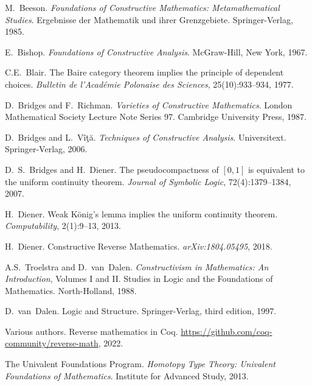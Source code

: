 \documentclass[11pt]{article}
\theoremstyle{plain}
\theoremstyle{definition}
\begin{document}

\begin{thebibliography}{99}

M.~Beeson.
\newblock \emph{Foundations of Constructive Mathematics: Metamathematical Studies}.
\newblock Ergebnisse der Mathematik und ihrer Grenzgebiete. Springer-Verlag, 1985.

E.~Bishop.
\newblock \emph{Foundations of Constructive Analysis}.
\newblock McGraw-Hill, New York, 1967.

C.E.~Blair.
\newblock The {B}aire category theorem implies the principle of dependent choices.
\newblock \emph{Bulletin de l'Acad\'{e}mie Polonaise des Sciences}, 25(10):933--934, 1977.

D.~Bridges and F.~Richman.
\newblock \emph{Varieties of Constructive Mathematics}.
\newblock London Mathematical Society Lecture Note Series 97. Cambridge University Press, 1987.

D.~Bridges and L.~Vîţă.
\newblock \emph{Techniques of Constructive Analysis}.
\newblock Universitext. Springer-Verlag, 2006.

D.~S.~Bridges and H.~Diener.
\newblock The pseudocompactness of $[0,1]$ is equivalent to the uniform continuity theorem.
\newblock \emph{Journal of Symbolic Logic}, 72(4):1379--1384, 2007.

H.~Diener.
\newblock Weak K\"onig's lemma implies the uniform continuity theorem.
\newblock \emph{Computability}, 2(1):9--13, 2013.

H.~Diener.
\newblock Constructive Reverse Mathematics.
\newblock \emph{arXiv:1804.05495}, 2018.

A.S.~Troelstra and D.~van~Dalen.
\newblock \emph{Constructivism in Mathematics: An Introduction}, Volumes I and II.
\newblock Studies in Logic and the Foundations of Mathematics. North-Holland, 1988.

D.~van~Dalen.
\newblock Logic and Structure.
\newblock Springer-Verlag, third edition, 1997.

Various authors.
\newblock Reverse mathematics in {Coq}.
\newblock \url{https://github.com/coq-community/reverse-math}, 2022.

The {Univalent Foundations Program}.
\newblock \emph{Homotopy Type Theory: Univalent Foundations of Mathematics}.
\newblock Institute for Advanced Study, 2013.


\end{thebibliography}
\end{document}
